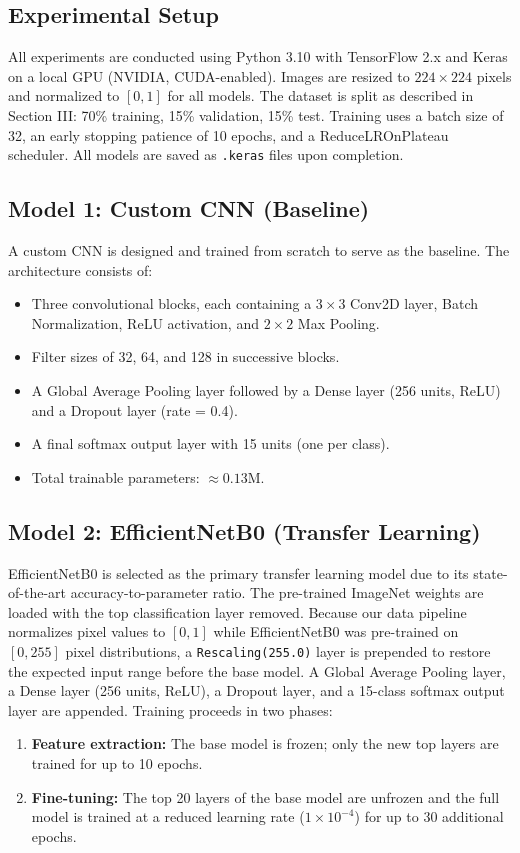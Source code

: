 \documentclass[10pt,twocolumn]{article}
\begin{document}
\subsection{Experimental Setup}

All experiments are conducted using Python 3.10 with TensorFlow 2.x and Keras on a local GPU (NVIDIA, CUDA-enabled). Images are resized to $224 \times 224$ pixels and normalized to $[0, 1]$ for all models. The dataset is split as described in Section III: 70\% training, 15\% validation, 15\% test. Training uses a batch size of 32, an early stopping patience of 10 epochs, and a ReduceLROnPlateau scheduler. All models are saved as \texttt{.keras} files upon completion.

\subsection{Model 1: Custom CNN (Baseline)}

A custom CNN is designed and trained from scratch to serve as the baseline. The architecture consists of:
\begin{itemize}
  \item Three convolutional blocks, each containing a $3 \times 3$ Conv2D layer, Batch Normalization, ReLU activation, and $2 \times 2$ Max Pooling.
  \item Filter sizes of 32, 64, and 128 in successive blocks.
  \item A Global Average Pooling layer followed by a Dense layer (256 units, ReLU) and a Dropout layer (rate = 0.4).
  \item A final softmax output layer with 15 units (one per class).
  \item Total trainable parameters: $\approx 0.13$M.
\end{itemize}

\subsection{Model 2: EfficientNetB0 (Transfer Learning)}

EfficientNetB0 \cite{EfficientNet2019} is selected as the primary transfer learning model due to its state-of-the-art accuracy-to-parameter ratio. The pre-trained ImageNet weights are loaded with the top classification layer removed. Because our data pipeline normalizes pixel values to $[0,1]$ while EfficientNetB0 was pre-trained on $[0,255]$ pixel distributions, a \texttt{Rescaling(255.0)} layer is prepended to restore the expected input range before the base model. A Global Average Pooling layer, a Dense layer (256 units, ReLU), a Dropout layer, and a 15-class softmax output layer are appended. Training proceeds in two phases:
\begin{enumerate}
  \item \textbf{Feature extraction:} The base model is frozen; only the new top layers are trained for up to 10 epochs.
  \item \textbf{Fine-tuning:} The top 20 layers of the base model are unfrozen and the full model is trained at a reduced learning rate ($1 \times 10^{-4}$) for up to 30 additional epochs.
\end{enumerate}
\end{document}
